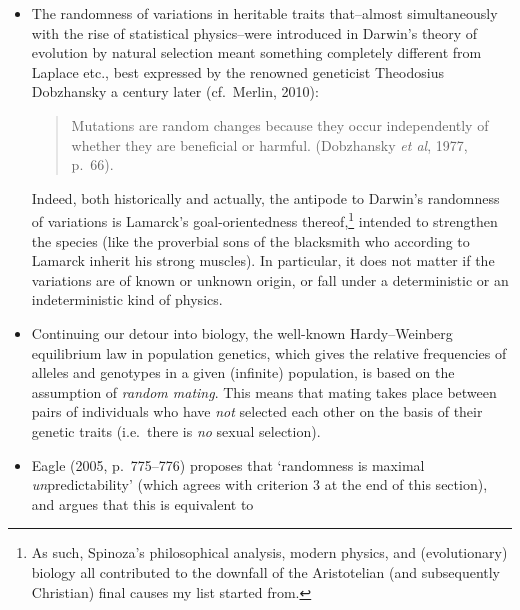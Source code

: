 \documentclass[12pt]{article}
\numberwithin{equation}{section}
\newcommand{\qm}{quantum mechanics}
\begin{document}
\begin{itemize}
\begin{quote}
\end{quote}

 This partly paved the way for the claim of irreducible randomness in \qm, although the influence of population studies and biology on intrinsic developments in physics should perhaps not be overestimated. However, the insight that probability and statistics gave rise to their own laws (as opposed to the fear that randomness is pretty much the same as lawlessness), which partly dated back to the previous two centuries (Hacking, 2006),
 surely made quantum \emph{theory} possible.
\item The randomness of variations in heritable traits that--almost simultaneously with the rise of statistical physics--were introduced in Darwin's theory of evolution by natural selection meant something completely different from Laplace etc., best expressed by the renowned geneticist Theodosius Dobzhansky a century later (cf.\ Merlin, 2010):
\begin{quote}\begin{small}
 Mutations are random changes because they occur independently of whether they are beneficial or harmful.
 (Dobzhansky \emph{et al}, 1977, p.\ 66).
\end{small}\end{quote}
 Indeed, both historically and actually, the antipode to Darwin's randomness of variations  is Lamarck's goal-orientedness thereof,\footnote{ As such, Spinoza's philosophical analysis, modern physics, and (evolutionary) biology all contributed to the downfall of the Aristotelian (and subsequently Christian)  final causes my list started from. } intended to strengthen the species (like the proverbial sons of the  blacksmith who according to Lamarck inherit his strong muscles). In particular, it does not matter if the variations are of known or unknown origin, or fall under a deterministic or an indeterministic kind of physics.
 \item Continuing our detour into biology,  the well-known Hardy--Weinberg equilibrium law in population genetics, which gives  the relative frequencies of alleles and genotypes in a given (infinite) population, is based on the assumption of \emph{random mating}. This means that mating takes place between pairs of individuals who have \emph{not} selected each other on the basis of their genetic traits (i.e.\ there is \emph{no} sexual selection).
 \item Eagle (2005, p.\ 775--776) proposes that `randomness is maximal \emph{un}predictability' (which agrees with criterion 3 at the end of this section), and argues that this is equivalent to 

\end{itemize}
\end{document}
